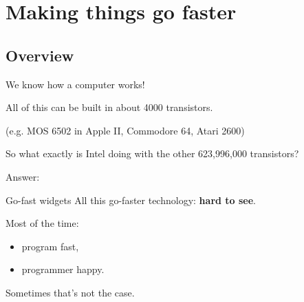 \documentclass[english,compress]{beamer}
\begin{document}
\section[Faster]{Making things go faster}
\subsection{Overview}
\begin{frame}{We know how a computer works!}

  All of this can be built in about 4000 transistors.

  (e.g. MOS 6502 in Apple II, Commodore 64, Atari 2600)
  \medskip

  So what exactly is Intel doing with the other 623,996,000 transistors?
  \medskip

  Answer: 
\end{frame}
\begin{frame}{Go-fast widgets}
  All this go-faster technology: \textbf{hard to see}.

  \bigskip
  Most of the time: 
  \begin{itemize}
    \item program fast,
    \item programmer happy.
  \end{itemize}

  \bigskip
  Sometimes that's not the case. 

  \uncover<+->{}
\end{frame}
\end{document}
